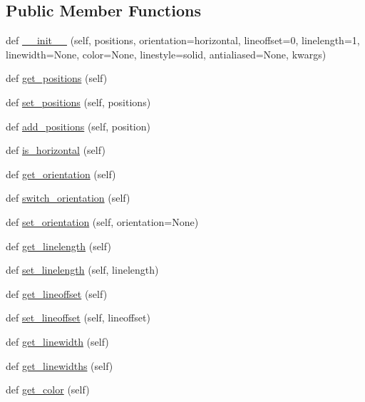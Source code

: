\subsection*{Public Member Functions}
\begin{DoxyCompactItemize}
\item 
def \hyperlink{classmatplotlib_1_1collections_1_1EventCollection_a95fbc9a0789ee33fa40642b135996b24}{\+\_\+\+\_\+init\+\_\+\+\_\+} (self, positions, orientation=\textquotesingle{}horizontal\textquotesingle{}, lineoffset=0, linelength=1, linewidth=None, color=None, linestyle=\textquotesingle{}solid\textquotesingle{}, antialiased=None, kwargs)
\item 
def \hyperlink{classmatplotlib_1_1collections_1_1EventCollection_a5e246d6c6160017a67b01ccf679d54b5}{get\+\_\+positions} (self)
\item 
def \hyperlink{classmatplotlib_1_1collections_1_1EventCollection_a8b5ff8003bdded5213330cbf1992bf93}{set\+\_\+positions} (self, positions)
\item 
def \hyperlink{classmatplotlib_1_1collections_1_1EventCollection_ac7cb967a80980594d16779819bdf6f3b}{add\+\_\+positions} (self, position)
\item 
def \hyperlink{classmatplotlib_1_1collections_1_1EventCollection_a848c9dbf2b2ad7dbcbf83931b3246dfb}{is\+\_\+horizontal} (self)
\item 
def \hyperlink{classmatplotlib_1_1collections_1_1EventCollection_a5d8541eaab4de02a2fdda511f92d72c7}{get\+\_\+orientation} (self)
\item 
def \hyperlink{classmatplotlib_1_1collections_1_1EventCollection_a5968a458d13a2b063c1a3568e7d8ccf8}{switch\+\_\+orientation} (self)
\item 
def \hyperlink{classmatplotlib_1_1collections_1_1EventCollection_aede2d85fc4c8c1eaa7780c06340149a8}{set\+\_\+orientation} (self, orientation=None)
\item 
def \hyperlink{classmatplotlib_1_1collections_1_1EventCollection_a742b9f7e9eee031a0899274c262db580}{get\+\_\+linelength} (self)
\item 
def \hyperlink{classmatplotlib_1_1collections_1_1EventCollection_a2beaf31284535493cd5f4fc33328b5ad}{set\+\_\+linelength} (self, linelength)
\item 
def \hyperlink{classmatplotlib_1_1collections_1_1EventCollection_af732f0a414876d475616606bb5c9d162}{get\+\_\+lineoffset} (self)
\item 
def \hyperlink{classmatplotlib_1_1collections_1_1EventCollection_a28dd1b664b1ce67b7d655587efbbc664}{set\+\_\+lineoffset} (self, lineoffset)
\item 
def \hyperlink{classmatplotlib_1_1collections_1_1EventCollection_a6f985d111085756f0b3868d7aa80c964}{get\+\_\+linewidth} (self)
\item 
def \hyperlink{classmatplotlib_1_1collections_1_1EventCollection_ad7da4572999d7937161acf0340a42276}{get\+\_\+linewidths} (self)
\item 
def \hyperlink{classmatplotlib_1_1collections_1_1EventCollection_ab259046b981f63a24b7ea44321ff8d5d}{get\+\_\+color} (self)
\end{DoxyCompactItemize}
